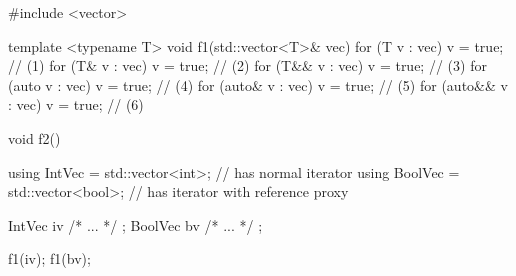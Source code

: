 {{{\begin{emcppslisting}
#include <vector>

template <typename T>
void f1(std::vector<T>& vec)
{
    for (T      v : vec) { v = true; }  // (1)
    for (T&     v : vec) { v = true; }  // (2)
    for (T&&    v : vec) { v = true; }  // (3)
    for (auto   v : vec) { v = true; }  // (4)
    for (auto&  v : vec) { v = true; }  // (5)
    for (auto&& v : vec) { v = true; }  // (6)
}

void f2()
{
    using IntVec  = std::vector<int>;   // has normal iterator
    using BoolVec = std::vector<bool>;  // has iterator with reference proxy

    IntVec  iv{ /* ... */ };
    BoolVec bv{ /* ... */ };

    f1(iv);
    f1(bv);
}
\end{emcppslisting}
    

}}}
